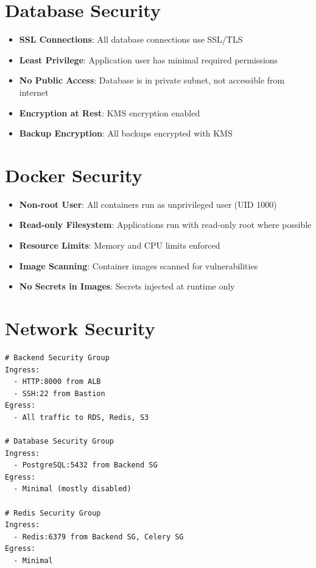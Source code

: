 \documentclass{report}
\begin{document}
\section{Database Security}

\begin{itemize}
  \item \textbf{SSL Connections}: All database connections use SSL/TLS
  \item \textbf{Least Privilege}: Application user has minimal required permissions
  \item \textbf{No Public Access}: Database is in private subnet, not accessible from internet
  \item \textbf{Encryption at Rest}: KMS encryption enabled
  \item \textbf{Backup Encryption}: All backups encrypted with KMS
\end{itemize}

\section{Docker Security}

\begin{itemize}
  \item \textbf{Non-root User}: All containers run as unprivileged user (UID 1000)
  \item \textbf{Read-only Filesystem}: Applications run with read-only root where possible
  \item \textbf{Resource Limits}: Memory and CPU limits enforced
  \item \textbf{Image Scanning}: Container images scanned for vulnerabilities
  \item \textbf{No Secrets in Images}: Secrets injected at runtime only
\end{itemize}

\section{Network Security}

\begin{lstlisting}[caption=AWS Security Group Configuration]
# Backend Security Group
Ingress:
  - HTTP:8000 from ALB
  - SSH:22 from Bastion
Egress:
  - All traffic to RDS, Redis, S3

# Database Security Group
Ingress:
  - PostgreSQL:5432 from Backend SG
Egress:
  - Minimal (mostly disabled)

# Redis Security Group
Ingress:
  - Redis:6379 from Backend SG, Celery SG
Egress:
  - Minimal
\end{lstlisting}
\end{document}
